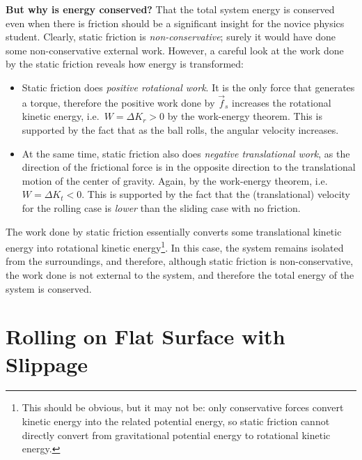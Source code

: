 \documentclass{../../oss-handout}
\begin{document}
\textbf{But why is energy conserved?} That the total system energy is conserved
even when there is friction should be a significant insight for the novice
physics student. Clearly, static friction is \emph{non-conservative}; surely it
would have done some non-conservative external work. However, a careful look at
the work done by the static friction reveals how energy is transformed:
\begin{itemize}[topsep=0pt]
\item Static friction does \emph{positive rotational work}. It is the only
  force that generates a torque, therefore the positive work done by $\vec f_s$
  increases the rotational kinetic energy, i.e.\ $W=\Delta K_r>0$ by the
  work-energy theorem. This is supported by the fact that as the ball rolls, the
  angular velocity increases.
\item At the same time, static friction also does \emph{negative translational
  work}, as the direction of the frictional force is in the opposite direction
  to the translational motion of the center of gravity. Again, by the
  work-energy theorem, i.e.\ $W=\Delta K_t<0$. This is supported by the fact
  that the (translational) velocity for the rolling case is \emph{lower} than
  the sliding case with no friction.
\end{itemize}
The work done by static friction essentially converts some translational kinetic
energy into rotational kinetic energy\footnote{This should be obvious, but it
  may not be: only conservative forces convert kinetic energy into the related
  potential energy, so static friction cannot directly convert from gravitational
  potential energy to rotational kinetic energy.}. In this case, the system
remains isolated from the surroundings, and therefore, although static friction
is non-conservative, the work done is not external to the system, and therefore
the total energy of the system is conserved.

\section{Rolling on Flat Surface with Slippage}
\end{document}
